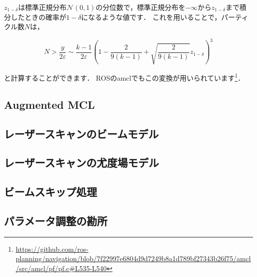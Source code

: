 \documentclass[{../../master}]{subfiles}
\begin{document}
$z_{1-\delta}$は標準正規分布$\mathcal{N}(0, 1)$の分位数で，標準正規分布を$-\infty$から$z_{1-\delta}$まで積分したときの確率が$1-\delta$になるような値です．
これを用いることで，パーティクル数$N$は，

\begin{equation}
  N > \frac{y}{2\varepsilon} \sim \frac{k-1}{2\varepsilon} \left( 1 - \frac{2}{9(k-1)} + \sqrt{\frac{2}{9(k-1)}}z_{1-\delta} \right)^{3}
\end{equation}

\noindent
と計算することができます．
ROSの\textsf{amcl}でもこの変換が用いられています\footnote{\url{https://github.com/ros-planning/navigation/blob/7f22997e6804d9d7249b8a1d789bf27343b26f75/amcl/src/amcl/pf/pf.c\#L535-L540}}．

\subsection{Augmented MCL}

\subsection{レーザースキャンのビームモデル}

\subsection{レーザースキャンの尤度場モデル}

\subsection{ビームスキップ処理}

\subsection{パラメータ調整の勘所}
\end{document}
